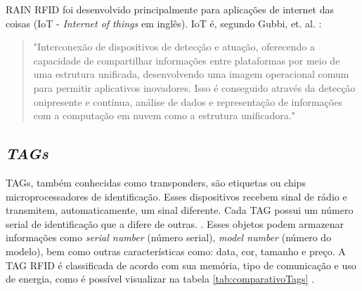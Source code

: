 RAIN RFID foi desenvolvido principalmente para aplicações de internet das coisas (IoT - \textit{Internet of things} em inglês). IoT é, segundo Gubbi, et. al. \cite{gubbi2013internet}:

\begin{quote}
    "Interconexão de dispositivos de detecção e atuação, oferecendo a capacidade de compartilhar informações entre plataformas por meio de uma estrutura unificada, desenvolvendo uma imagem operacional comum para permitir aplicativos inovadores. Isso é conseguido através da detecção onipresente e contínua, análise de dados e representação de informações com a computação em nuvem como a estrutura unificadora."
\end{quote}

\subsection{\textit{TAGs}}
TAGs, também conhecidas como transponders, são etiquetas ou chips microprocessadores de identificação. Esses dispositivos recebem sinal de rádio e transmitem, automaticamente, um sinal diferente. Cada TAG possui um número serial de identificação que a difere de outras. \cite{chawla2007overview}. Esses objetos podem armazenar informações como \textit{serial number} (número serial), \textit{model number} (número do modelo), bem como outras características como: data, cor, tamanho e preço. A TAG RFID é classificada de acordo com sua memória, tipo de comunicação e uso de energia, como é possível visualizar na tabela \ref{tab:comparativoTags}  \cite{AhmedIntegrationStreamMapping}.

